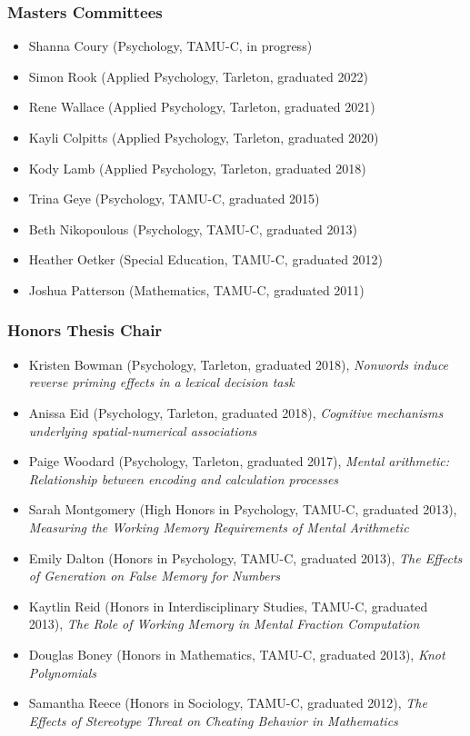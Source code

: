 \documentclass[article,10pt]{article}
\begin{document}
\subsubsection*{Masters Committees}
\label{sec:org4657f17}
\begin{itemize}
\item Shanna Coury (Psychology, TAMU-C, in progress)
\item Simon Rook (Applied Psychology, Tarleton, graduated 2022)
\item Rene Wallace (Applied Psychology, Tarleton, graduated 2021)
\item Kayli Colpitts (Applied Psychology, Tarleton, graduated 2020)
\item Kody Lamb (Applied Psychology, Tarleton, graduated 2018)
\item Trina Geye (Psychology, TAMU-C, graduated 2015)
\item Beth Nikopoulous (Psychology, TAMU-C, graduated 2013)
\item Heather Oetker (Special Education, TAMU-C, graduated 2012)
\item Joshua Patterson (Mathematics, TAMU-C, graduated 2011)
\end{itemize}

\subsubsection*{Honors Thesis Chair}
\label{sec:org072102e}

\begin{itemize}
\item Kristen Bowman (Psychology, Tarleton, graduated 2018), \emph{Nonwords induce reverse priming effects in a lexical decision task}
\item Anissa Eid (Psychology, Tarleton, graduated 2018), \emph{Cognitive mechanisms underlying spatial-numerical associations}
\item Paige Woodard (Psychology, Tarleton, graduated 2017), \emph{Mental arithmetic: Relationship between encoding and calculation processes}
\item Sarah Montgomery (High Honors in Psychology, TAMU-C, graduated 2013), \emph{Measuring the Working Memory Requirements of Mental Arithmetic}
\item Emily Dalton (Honors in Psychology, TAMU-C, graduated 2013), \emph{The Effects of Generation on False Memory for Numbers}
\item Kaytlin Reid (Honors in Interdisciplinary Studies, TAMU-C, graduated 2013), \emph{The Role of Working Memory in Mental Fraction Computation}
\item Douglas Boney (Honors in Mathematics, TAMU-C, graduated 2013), \emph{Knot Polynomials}
\item Samantha Reece (Honors in Sociology, TAMU-C, graduated 2012), \emph{The Effects of Stereotype Threat on Cheating Behavior in Mathematics}
\end{itemize}
\end{document}
